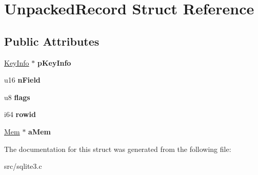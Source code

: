 \hypertarget{struct_unpacked_record}{\section{Unpacked\-Record Struct Reference}
\label{struct_unpacked_record}
}
\subsection*{Public Attributes}
\begin{DoxyCompactItemize}
\item 
\hypertarget{struct_unpacked_record_aeb43e7a1e300857cab2cbe98eacd575b}{\hyperlink{struct_key_info}{Key\-Info} $\ast$ {\bfseries p\-Key\-Info}}\label{struct_unpacked_record_aeb43e7a1e300857cab2cbe98eacd575b}

\item 
\hypertarget{struct_unpacked_record_a2c5062735cdbc5039679d255cc900668}{u16 {\bfseries n\-Field}}\label{struct_unpacked_record_a2c5062735cdbc5039679d255cc900668}

\item 
\hypertarget{struct_unpacked_record_ab24dd1a413192bae21ec613ca3b239a1}{u8 {\bfseries flags}}\label{struct_unpacked_record_ab24dd1a413192bae21ec613ca3b239a1}

\item 
\hypertarget{struct_unpacked_record_a5ec2064b28fcf43b46bf92a515e9203e}{i64 {\bfseries rowid}}\label{struct_unpacked_record_a5ec2064b28fcf43b46bf92a515e9203e}

\item 
\hypertarget{struct_unpacked_record_a3299c322ceb8b758dacc59701021ae9f}{\hyperlink{struct_mem}{Mem} $\ast$ {\bfseries a\-Mem}}\label{struct_unpacked_record_a3299c322ceb8b758dacc59701021ae9f}

\end{DoxyCompactItemize}


The documentation for this struct was generated from the following file\-:\begin{DoxyCompactItemize}
\item 
src/sqlite3.\-c\end{DoxyCompactItemize}
